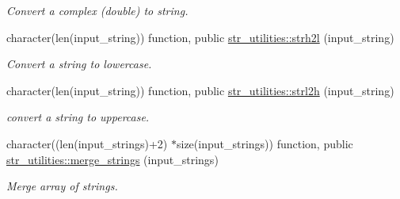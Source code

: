 \begin{DoxyCompactItemize}
\begin{DoxyCompactList}\small\item\em Convert a complex (double) to string. \end{DoxyCompactList}\item 
character(len(input\+\_\+string)) function, public \hyperlink{namespacestr__utilities_a219964a283968cc6a968db0197d2187e}{str\+\_\+utilities\+::strh2l} (input\+\_\+string)
\begin{DoxyCompactList}\small\item\em Convert a string to lowercase. \end{DoxyCompactList}\item 
character(len(input\+\_\+string)) function, public \hyperlink{namespacestr__utilities_a7e2e441d509c12045a3373819040a806}{str\+\_\+utilities\+::strl2h} (input\+\_\+string)
\begin{DoxyCompactList}\small\item\em convert a string to uppercase. \end{DoxyCompactList}\item 
character((len(input\+\_\+strings)+2) $\ast$size(input\+\_\+strings)) function, public \hyperlink{namespacestr__utilities_a6ab16f33c155db79844279c6a56a494c}{str\+\_\+utilities\+::merge\+\_\+strings} (input\+\_\+strings)
\begin{DoxyCompactList}\small\item\em Merge array of strings. \end{DoxyCompactList}\end{DoxyCompactItemize}
